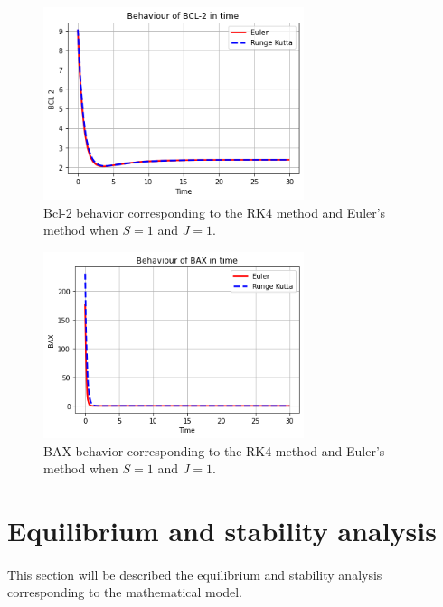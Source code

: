 \begin{figure}[hbt!]
	\centering
	\begin{framed}
	\includegraphics[width=0.68\textwidth]{Figures/D/N5.png}
		\end{framed}
	\caption{Bcl-2 behavior corresponding to the RK4 method and Euler's method when $S =1$ and $J=1$.}
	\label{r23}
\end{figure}

\begin{figure}[hbt!]
	\centering
	\begin{framed}
	\includegraphics[width=0.68\textwidth]{Figures/D/N6.png}
		\end{framed}
	\caption{BAX behavior corresponding to the RK4 method and Euler's method when $S =1$ and $J=1$.}
	\label{r24}
\end{figure}

\section{Equilibrium and stability analysis}
\paragraph{}

This section will be described the equilibrium and stability analysis
corresponding to the mathematical model. 

